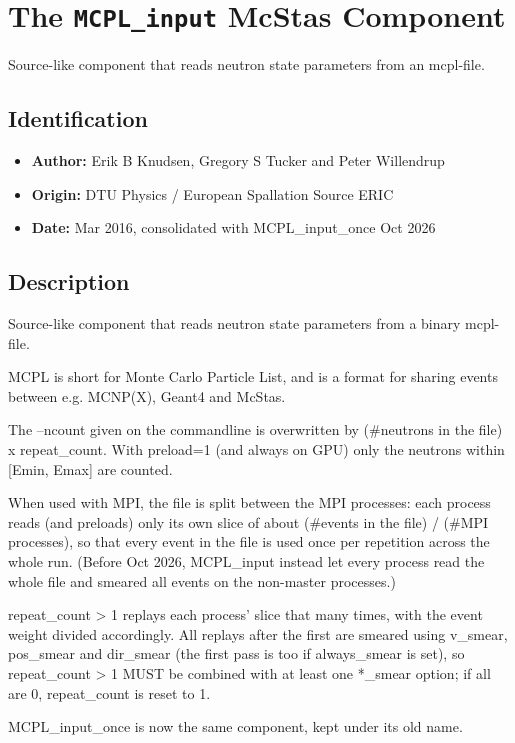 \section{The \texttt{MCPL\_input} McStas Component}
Source-like component that reads neutron state parameters from an mcpl-file.

\subsection*{Identification}
\begin{itemize}
  \item \textbf{Author:} Erik B Knudsen, Gregory S Tucker and Peter Willendrup
  \item \textbf{Origin:} DTU Physics / European Spallation Source ERIC
  \item \textbf{Date:} Mar 2016, consolidated with MCPL\_input\_once Oct 2026
\end{itemize}

\subsection*{Description}
Source-like component that reads neutron state parameters from a binary mcpl-file.

MCPL is short for Monte Carlo Particle List, and is a format for sharing events between e.g. MCNP(X), Geant4 and McStas.

The --ncount given on the commandline is overwritten by (\#neutrons in the file) x repeat\_count. With preload=1 (and always on GPU) only the neutrons within [Emin, Emax] are counted.

When used with MPI, the file is split between the MPI processes: each process reads (and preloads) only its own slice of about (\#events in the file) / (\#MPI processes), so that every event in the file is used once per repetition across the whole run. (Before Oct 2026, MCPL\_input instead let every process read the whole file and smeared all events on the non-master processes.)

repeat\_count \textgreater{} 1 replays each process' slice that many times, with the event weight divided accordingly. All replays after the first are smeared using v\_smear, pos\_smear and dir\_smear (the first pass is too if always\_smear is set), so repeat\_count \textgreater{} 1 MUST be combined with at least one *\_smear option; if all are 0, repeat\_count is reset to 1.

MCPL\_input\_once is now the same component, kept under its old name.

